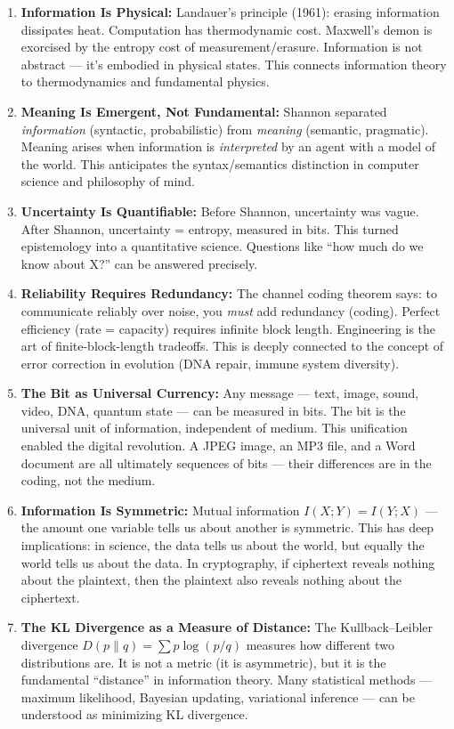 \begin{enumerate}
\item \textbf{Information Is Physical:} Landauer's principle (1961): erasing information dissipates heat. Computation has thermodynamic cost. Maxwell's demon is exorcised by the entropy cost of measurement/erasure. Information is not abstract — it's embodied in physical states. This connects information theory to thermodynamics and fundamental physics.

\item \textbf{Meaning Is Emergent, Not Fundamental:} Shannon separated \emph{information} (syntactic, probabilistic) from \emph{meaning} (semantic, pragmatic). Meaning arises when information is \emph{interpreted} by an agent with a model of the world. This anticipates the syntax/semantics distinction in computer science and philosophy of mind.

\item \textbf{Uncertainty Is Quantifiable:} Before Shannon, uncertainty was vague. After Shannon, uncertainty = entropy, measured in bits. This turned epistemology into a quantitative science. Questions like ``how much do we know about X?'' can be answered precisely.

\item \textbf{Reliability Requires Redundancy:} The channel coding theorem says: to communicate reliably over noise, you \emph{must} add redundancy (coding). Perfect efficiency (rate = capacity) requires infinite block length. Engineering is the art of finite-block-length tradeoffs. This is deeply connected to the concept of error correction in evolution (DNA repair, immune system diversity).

\item \textbf{The Bit as Universal Currency:} Any message — text, image, sound, video, DNA, quantum state — can be measured in bits. The bit is the universal unit of information, independent of medium. This unification enabled the digital revolution. A JPEG image, an MP3 file, and a Word document are all ultimately sequences of bits — their differences are in the coding, not the medium.

\item \textbf{Information Is Symmetric:} Mutual information $I(X;Y) = I(Y;X)$ — the amount one variable tells us about another is symmetric. This has deep implications: in science, the data tells us about the world, but equally the world tells us about the data. In cryptography, if ciphertext reveals nothing about the plaintext, then the plaintext also reveals nothing about the ciphertext.

\item \textbf{The KL Divergence as a Measure of Distance:} The Kullback--Leibler divergence $D(p\|q) = \sum p\log(p/q)$ measures how different two distributions are. It is not a metric (it is asymmetric), but it is the fundamental ``distance'' in information theory. Many statistical methods — maximum likelihood, Bayesian updating, variational inference — can be understood as minimizing KL divergence.
\end{enumerate}

